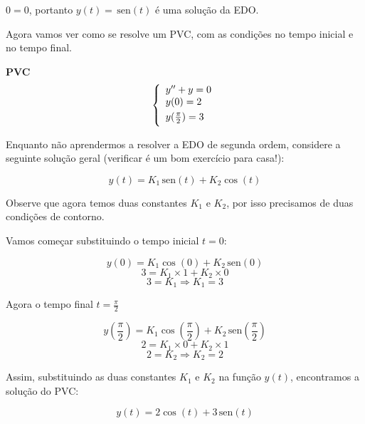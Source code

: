 \documentclass[a4paper]{article}
\providecommand{\sin}{} \renewcommand{\sin}{\hspace{2pt}\mathrm{sen}}
\begin{document}
$0=0$, portanto $y(t) = \sin(t)$ é uma solução da EDO.


Agora vamos ver como se resolve um PVC, com as condições no tempo
inicial e no tempo final.

{\bf PVC}
\begin{displaymath}
  \left\{
    \begin{array}{l}
      y'' + y=0\\
      \smallskip
      y(0)=2\\
      \smallskip
      y(\frac{\pi}{2})=3
    \end{array}
  \right.
\end{displaymath}

Enquanto não aprendermos a resolver a EDO de segunda ordem, considere
a seguinte solução geral (verificar é um bom exercício para casa!):

\begin{displaymath}
  y(t) = K_1\sin(t) + K_2\cos(t)
\end{displaymath}

Observe que agora temos duas constantes $K_1$ e $K_2$, por isso
precisamos de duas condições de contorno.

Vamos começar substituindo o tempo inicial $t=0$:

\begin{displaymath}
  y(0)= K_1\cos(0) + K_2\sin(0)
\end{displaymath}
\begin{displaymath}
  3 = K_1 \times 1 + K_2 \times 0
\end{displaymath}
\begin{displaymath}
  3=K_1 \Rightarrow K_1=3
\end{displaymath}

Agora o tempo final $t=\frac{\pi}{2}$

\begin{displaymath}
  y(\frac{\pi}{2}) = K_1 \cos(\frac{\pi}{2}) + K_2\sin(\frac{\pi}{2})
\end{displaymath}
\begin{displaymath}
  2 = K_1 \times 0 + K_2\times 1
\end{displaymath}
\begin{displaymath}
  2 = K_2 \Rightarrow K_2=2
\end{displaymath}

Assim, substituindo as duas constantes $K_1$ e $K_2$ na função $y(t)$,
encontramos a solução do PVC:

\begin{displaymath}
  y(t) = 2\cos(t) + 3\sin(t)
\end{displaymath}
\end{document}
